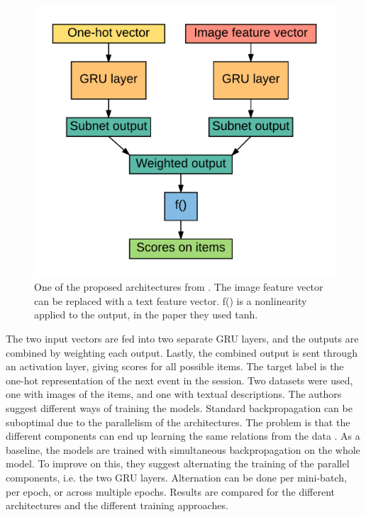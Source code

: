 \begin{figure}[htp]
	\centering
	\includegraphics[width=1.0\textwidth]{fig/parallell-rnn.png}
	\caption{One of the proposed architectures from \cite{Hidasi:2016:PRN:2959100.2959167}. The image feature vector can be replaced with a text feature vector. f() is a nonlinearity applied to the output, in the paper they used tanh.}
	\label{fig:parallell-rnn}
\end{figure}

The two input vectors are fed into two separate GRU layers, and the outputs are combined by weighting each output. Lastly, the combined output is sent through an activation layer, giving scores for all possible items. The target label is the one-hot representation of the next event in the session. Two datasets were used, one with images of the items, and one with textual descriptions. The authors suggest different ways of training the models. Standard backpropagation can be suboptimal due to the parallelism of the architectures. The problem is that the different components can end up learning the same relations from the data \cite{Hidasi:2016:PRN:2959100.2959167}. As a baseline, the models are trained with simultaneous backpropagation on the whole model. To improve on this, they suggest alternating the training of the parallel components, i.e. the two GRU layers. Alternation can be done per mini-batch, per epoch, or across multiple epochs. Results are compared for the different architectures and the different training approaches.

